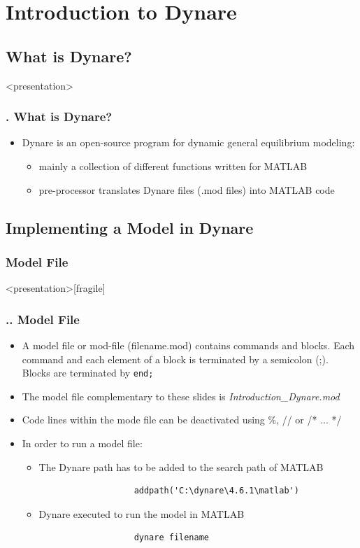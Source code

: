\documentclass[11pt,aspectratio=169]{beamer}
\begin{document}
\section{Introduction to Dynare}

\subsection{What is Dynare?}
\begin{frame}<presentation>
\frametitle{{\thesection.\thesubsection} What is Dynare?}
  \begin{itemize}
		\item Dynare is an open-source program for dynamic general equilibrium modeling:
		\begin{itemize}
			\item mainly a collection of different functions written for MATLAB
			\item pre-processor translates Dynare files (.mod files) into MATLAB code
		\end{itemize}
	\end{itemize}
\end{frame}

\subsection{Implementing a Model in Dynare}
\subsubsection{Model File}
\begin{frame}<presentation>[fragile]
	\frametitle{{\thesection.\thesubsection.\thesubsubsection} Model File}
	\begin{itemize}
		\item A model file or mod-file (filename.mod) contains commands and blocks. Each command and each element of a block is terminated by a semicolon (;). Blocks are terminated by \texttt{end;} 
		\item The model file complementary to these slides is \textit{Introduction\_Dynare.mod}
		\item Code lines within the mode file can be deactivated using \%, // or /* ... */
		\item In order to run a model file:
		\begin{itemize}
			\item The Dynare path has to be added to the search path of MATLAB
				\begin{verbatim}
				   addpath('C:\dynare\4.6.1\matlab')
				\end{verbatim}
			\item Dynare executed to run the model in MATLAB
				\begin{verbatim}
				   dynare filename
				\end{verbatim}
		\end{itemize} 
	\end{itemize}
\end{frame}
\end{document}
